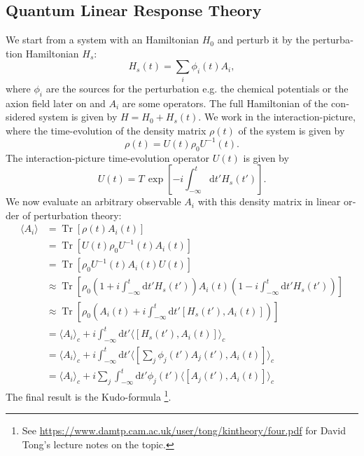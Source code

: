 \documentclass[master,       %
               twoside,        %
               BCOR10mm,       %
               english,ngerman, %
               ]{GAUBM}
\begin{document}
\begin{otherlanguage}{english}
\section{Quantum Linear Response Theory}
We start from a system with an Hamiltonian $H_0$ and perturb it by the perturbation Hamiltonian $H_s$:
\begin{equation}
	H_s(t) = \sum_i \phi_i(t) A_i,
\end{equation}
where $\phi_i$ are the sources for the perturbation e.g. 
the chemical potentials or the axion field later on
and $A_i$ are some operators.
The full Hamiltonian of the considered system is given by $H = H_0 + H_s(t)$.
We work in the interaction-picture, where the time-evolution of the density matrix $\rho(t)$ of the system is given by
\begin{equation}
    \rho(t) = U(t) \rho_0 U^{-1}(t).
\end{equation}
The interaction-picture time-evolution operator $U(t)$ is given by
\begin{equation}
    U(t) = T \, \exp \left[ - i \int_{-\infty}^t  \mathrm{d} t' H_s(t') \right].
\end{equation}
We now evaluate an arbitrary observable $A_i$ with this density matrix in linear order of perturbation theory:
\begin{align}
	\label{eq:linear_response}
    \langle A_i \rangle &= \operatorname{Tr} \left[ \rho(t) A_i(t) \right] \nonumber \\
    &= \operatorname{Tr} \left[ U(t) \rho_0 U^{-1}(t) A_i(t) \right] \nonumber \\
    &= \operatorname{Tr} \left[ \rho_0 U^{-1}(t) A_i(t) U(t) \right] \nonumber \\
    &\approx \operatorname{Tr} \left[ \rho_0 (1 + i \int_{-\infty}^t \mathrm{d} t' H_s(t')) A_i(t) (1 - i \int_{-\infty}^t \mathrm{d} t' H_s(t')) \right] \nonumber \\
    &\approx \operatorname{Tr} \left[ \rho_0 (A_i(t) + i \int_{-\infty}^t \mathrm{d} t' [H_s(t'), A_i(t)] ) \right] \nonumber \\
    &= \langle A_i \rangle_c + i \int_{-\infty}^t \mathrm{d} t' \langle [H_s(t'), A_i(t)] \rangle_c \nonumber \\
    &= \langle A_i \rangle_c + i \int_{-\infty}^t \mathrm{d} t' \langle [\sum_j \phi_j(t') A_j(t'), A_i(t)] \rangle_c  \nonumber \\
    &= \langle A_i \rangle_c + i \sum_j \int_{-\infty}^t \mathrm{d} t' \phi_j(t') \langle [A_j(t'), A_i(t)] \rangle_c
\end{align}
The final result is the Kudo-formula \footnote{See \url{https://www.damtp.cam.ac.uk/user/tong/kintheory/four.pdf} for David Tong's lecture notes on the topic.}.



\end{otherlanguage}
\end{document}
